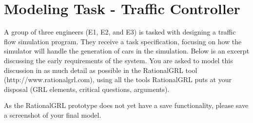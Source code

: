 $\ $\\
\newpage
\section{Modeling Task - Traffic Controller}
\label{sect:survey}

A group of three engineers (E1, E2, and E3) is tasked with designing a traffic flow simulation program. They receive a task specification, focusing on how the simulator will handle the generation of cars in the simulation. Below is an excerpt discussing the early requirements of the system. You are asked to model this discussion in as much detail as possible in the RationalGRL tool (http://www.rationalgrl.com), using all the tools RationalGRL puts at your disposal (GRL elements, critical questions, arguments). 

As the RationalGRL prototype does not yet have a save functionality, please save a screenshot of your final model.\\

